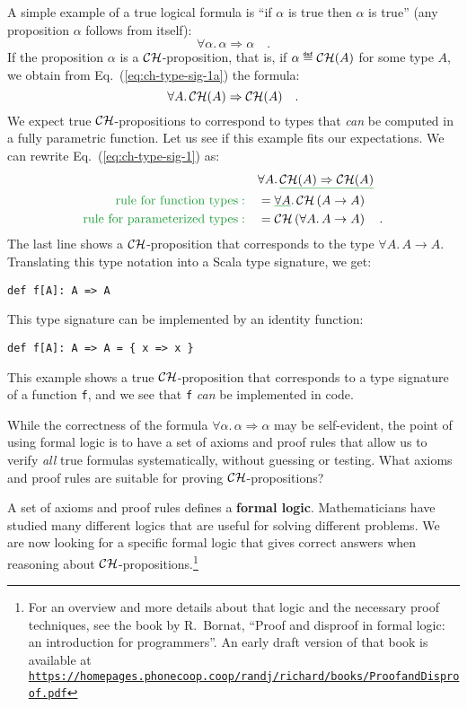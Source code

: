 A simple example of a true logical formula is \textsf{``}if $\alpha$ is true
then $\alpha$ is true\textsf{''} (any proposition $\alpha$ follows from
itself):
\begin{equation}
\forall\alpha.\,\alpha\Rightarrow\alpha\quad.\label{eq:ch-type-sig-1a}
\end{equation}
If the proposition $\alpha$ is a ${\cal CH}$-proposition, that is,
if $\alpha\triangleq{\cal CH}(A)$ for some type $A$, we obtain from
Eq.~(\ref{eq:ch-type-sig-1a}) the formula:
\begin{equation}
\forall A.\,{\cal CH}(A)\Rightarrow{\cal CH}(A)\quad.\label{eq:ch-type-sig-1}
\end{equation}
We expect true ${\cal CH}$-propositions to correspond to types that
\emph{can} be computed in a fully parametric function. Let us see
if this example fits our expectations. We can rewrite Eq.~(\ref{eq:ch-type-sig-1})
as:
\begin{align*}
 & \forall A.\,\gunderline{{\cal CH}(A)\Rightarrow{\cal CH}(A)}\\
{\color{greenunder}\text{rule for function types}:}\quad & =\gunderline{\forall A}.\,{\cal CH}\left(A\rightarrow A\right)\\
{\color{greenunder}\text{rule for parameterized types}:}\quad & ={\cal CH}\left(\forall A.\,A\rightarrow A\right)\quad.
\end{align*}
The last line shows a ${\cal CH}$-proposition that corresponds to
the type $\forall A.\,A\rightarrow A$. Translating this type notation
into a Scala type signature, we get:
\begin{lstlisting}
def f[A]: A => A
\end{lstlisting}
This type signature can be implemented by an identity function:
\begin{lstlisting}
def f[A]: A => A = { x => x }
\end{lstlisting}
This example shows a true ${\cal CH}$-proposition that corresponds
to a type signature of a function \lstinline!f!, and we see that
\lstinline!f! \emph{can} be implemented in code.

While the correctness of the formula $\forall\alpha.\,\alpha\Rightarrow\alpha$
may be self-evident, the point of using formal logic is to have a
set of axioms and proof rules that allow us to verify \emph{all} true
formulas systematically, without guessing or testing. What axioms
and proof rules are suitable for proving ${\cal CH}$-propositions?

A set of axioms and proof rules defines a \textbf{formal logic}.
Mathematicians have studied many different logics that are useful
for solving different problems. We are now looking for a specific
formal logic that gives correct answers when reasoning about ${\cal CH}$-propositions.\footnote{\label{fn:Bornat-proof-book}For an overview
and more details about that logic and the necessary proof techniques,
see the book by R.~Bornat, \textsf{``}Proof and disproof in formal logic:
an introduction for programmers\textsf{''}. An early draft version of that
book is available at \texttt{\href{https://homepages.phonecoop.coop/randj/richard/books/ProofandDisproof.pdf}{https://homepages.phonecoop.coop/randj/richard/books/ProofandDisproof.pdf}}}

